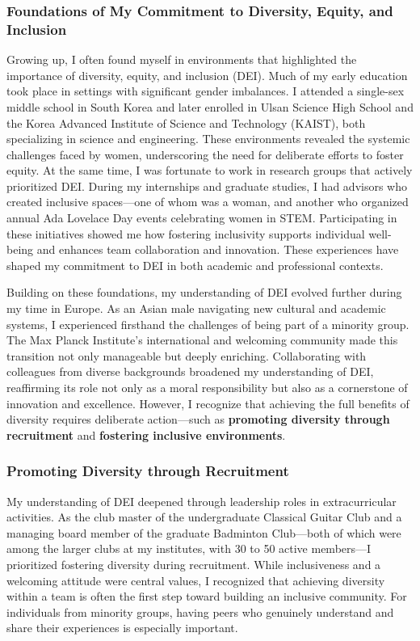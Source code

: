 \documentclass{article}
\begin{document}
\thispagestyle{firstpage} %

\subsubsection*{Foundations of My Commitment to Diversity, Equity, and Inclusion}

Growing up, I often found myself in environments that highlighted the importance of diversity, equity, and inclusion (DEI). Much of my early education took place in settings with significant gender imbalances. I attended a single-sex middle school in South Korea and later enrolled in Ulsan Science High School and the Korea Advanced Institute of Science and Technology (KAIST), both specializing in science and engineering. These environments revealed the systemic challenges faced by women, underscoring the need for deliberate efforts to foster equity. At the same time, I was fortunate to work in research groups that actively prioritized DEI. During my internships and graduate studies, I had advisors who created inclusive spaces—one of whom was a woman, and another who organized annual Ada Lovelace Day events celebrating women in STEM. Participating in these initiatives showed me how fostering inclusivity supports individual well-being and enhances team collaboration and innovation. These experiences have shaped my commitment to DEI in both academic and professional contexts.

Building on these foundations, my understanding of DEI evolved further during my time in Europe. As an Asian male navigating new cultural and academic systems, I experienced firsthand the challenges of being part of a minority group. The Max Planck Institute's international and welcoming community made this transition not only manageable but deeply enriching. Collaborating with colleagues from diverse backgrounds broadened my understanding of DEI, reaffirming its role not only as a moral responsibility but also as a cornerstone of innovation and excellence. However, I recognize that achieving the full benefits of diversity requires deliberate action—such as \textbf{promoting diversity through recruitment} and \textbf{fostering inclusive environments}.

\subsubsection*{Promoting Diversity through Recruitment} 

My understanding of DEI deepened through leadership roles in extracurricular activities. As the club master of the undergraduate Classical Guitar Club and a managing board member of the graduate Badminton Club—both of which were among the larger clubs at my institutes, with 30 to 50 active members—I prioritized fostering diversity during recruitment. While inclusiveness and a welcoming attitude were central values, I recognized that achieving diversity within a team is often the first step toward building an inclusive community. For individuals from minority groups, having peers who genuinely understand and share their experiences is especially important.
\end{document}
